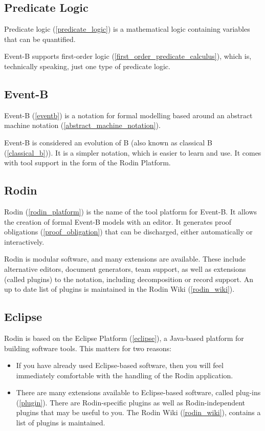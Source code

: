 \subsection{Predicate Logic}

Predicate logic (\ref{predicate_logic}) is a mathematical logic containing variables that can be quantified.

Event-B supports first-order logic (\ref{first_order_predicate_calculus}), which is, technically speaking, just one type of predicate logic.  

\subsection{Event-B}

Event-B (\ref{eventb}) is a notation for formal modelling based around an abstract machine notation (\ref{abstract_machine_notation}).

Event-B is considered an evolution of B (also known as classical B (\ref{classical_b})). It is a simpler notation, which is easier to learn and use. It comes with tool support in the form of the Rodin Platform.

\subsection{Rodin}

Rodin (\ref{rodin_platform}) is the name of the tool platform for Event-B.  It allows the creation of formal Event-B models with an editor.  It generates proof obligations (\ref{proof_obligation}) that can be discharged, either automatically or interactively.

Rodin is modular software, and many extensions are available.  These include alternative editors, document generators, team support, as well as extensions (called plugins) to the notation, including decomposition or record support.  An up to date list of plugins is maintained in the Rodin Wiki (\ref{rodin_wiki}).

\subsection{Eclipse} \label{subsection_eclipse}

Rodin is based on the Eclipse Platform (\ref{eclipse}), a Java-based platform for building software tools.  This matters for two reasons:
\begin{itemize}
	\item If you have already used Eclipse-based software, then you will feel immediately comfortable with the handling of the Rodin application.
	\item There are many extensions available to Eclipse-based software, called plug-ins (\ref{plugin}).  There are Rodin-specific plugins as well as Rodin-independent plugins that may be useful to you.  The Rodin Wiki (\ref{rodin_wiki}), contains a list of plugins is maintained.
\end{itemize}

